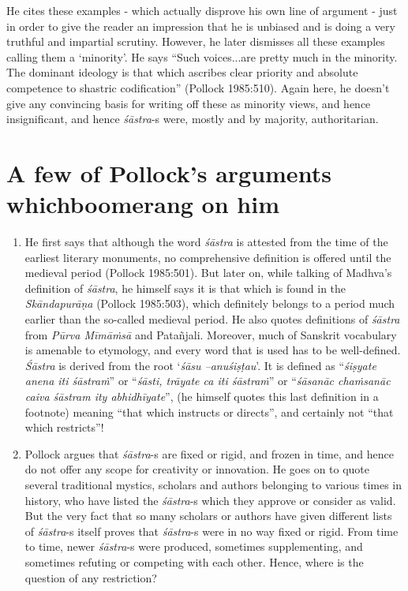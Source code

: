 \begin{enumerate}
He cites these examples - which actually disprove his own line of argument - just in order to give the reader an impression that he is unbiased and is doing a very truthful and impartial scrutiny. However, he later dismisses all these examples calling them a `minority'. He says ``Such voices...are pretty much in the minority. The dominant ideology is that which ascribes clear priority and absolute competence to shastric codification'' (Pollock 1985:510). Again here, he doesn't give any convincing basis for writing off these as minority views, and hence insignificant, and hence {\it śāstra}-s were, mostly and by majority, authoritarian. 
\end{enumerate}

\section*{A few of Pollock’s arguments which\newline boomerang on him}

\begin{enumerate}
\item He first says that although the word {\it śāstra} is attested from the time of the earliest literary monuments, no comprehensive definition is offered until the medieval period (Pollock 1985:501). But later on, while talking of Madhva's definition of {\it śāstra}, he himself says it is that which is found in the {\it Skāndapurāṇa} (Pollock 1985:503), which definitely belongs to a period much earlier than the so-called medieval period. He also quotes definitions of {\it śāstra} from \textit{Pūrva Mīmāṁsā} and Patañjali. Moreover, much of Sanskrit vocabulary is amenable to  etymology, and every word that is used has to be well-defined. {\it Śāstra} is derived from the root `\textit{śāsu --anuśiṣṭau}'. It is defined as ``\textit{śiṣyate anena iti śāstraṁ}'' or ``\textit{śāsti, trāyate ca iti śāstraṁ}'' or ``\textit{śāsanāc chaṁsanāc caiva śāstram ity abhidhīyate}'', (he himself quotes this last definition in a footnote) meaning ``that which instructs or directs'', and certainly not ``that which restricts''!

\item Pollock argues that {\it śāstra}-s are fixed or rigid, and frozen in time, and hence do not offer any scope for creativity or innovation. He goes on to quote several traditional mystics, scholars and authors belonging to various times in history, who have listed the {\it śāstra}-s which they approve or consider as valid. But the very fact that so many scholars or authors have given different lists of {\it śāstra}-s itself proves that {\it śāstra}-s were in no way fixed or rigid. From time to time, newer {\it śāstra}-s were produced, sometimes supplementing, and sometimes refuting or competing with each other. Hence, where is the question of any restriction?
\end{enumerate}

